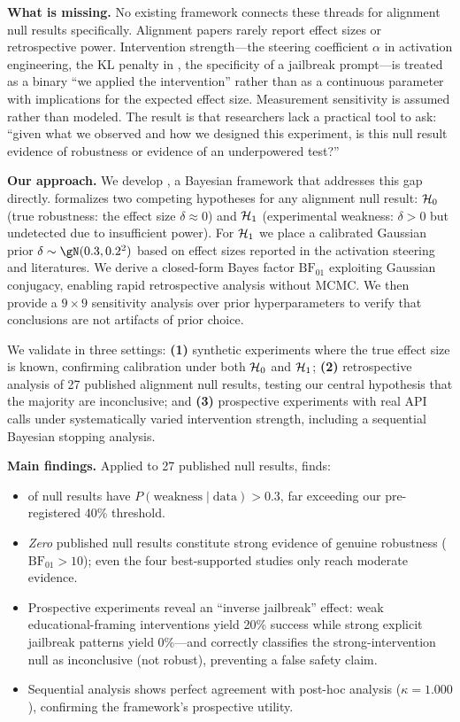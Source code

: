 {\bf What is missing.} No existing framework connects these threads for alignment null
results specifically. Alignment papers rarely report effect sizes or retrospective
power. Intervention strength---the steering coefficient $\alpha$ in activation
engineering, the KL penalty in \rlhf, the specificity of a jailbreak prompt---is
treated as a binary ``we applied the intervention'' rather than as a continuous
parameter with implications for the expected effect size. Measurement sensitivity
is assumed rather than modeled. The result is that researchers lack a practical tool
to ask: ``given what we observed and how we designed this experiment, is this null
result evidence of robustness or evidence of an underpowered test?''

{\bf Our approach.} We develop \ours, a Bayesian framework that addresses this gap
directly. \ours formalizes two competing hypotheses for any alignment null result:
$\mathcal{H}_0$ (true robustness: the effect size $\delta \approx 0$) and $\mathcal{H}_1$ (experimental
weakness: $\delta > 0$ but undetected due to insufficient power). For $\mathcal{H}_1$ we place
a calibrated Gaussian prior $\delta \sim \gN(0.3, 0.2^2)$ based on effect sizes
reported in the activation steering and \rlhf literatures. We derive a closed-form
Bayes factor $\mathrm{BF}_{01}$ exploiting Gaussian conjugacy, enabling rapid
retrospective analysis without MCMC. We then provide a $9 \times 9$ sensitivity
analysis over prior hyperparameters to verify that conclusions are not artifacts of
prior choice.

We validate \ours in three settings: \textbf{(1)} synthetic experiments where the
true effect size is known, confirming calibration under both $\mathcal{H}_0$ and $\mathcal{H}_1$;
\textbf{(2)} retrospective analysis of 27 published alignment null results, testing
our central hypothesis that the majority are inconclusive; and \textbf{(3)}
prospective experiments with real \llama API calls under systematically varied
intervention strength, including a sequential Bayesian stopping analysis.

{\bf Main findings.} Applied to 27 published null results, \ours finds:
\begin{itemize}[leftmargin=*,itemsep=0pt,topsep=4pt]
    \item \mainresult of null results have $P(\text{weakness} \mid \text{data}) > 0.3$,
    far exceeding our pre-registered 40\% threshold.
    \item \emph{Zero} published null results constitute strong evidence of genuine
    robustness ($\mathrm{BF}_{01} > 10$); even the four best-supported studies only
    reach moderate evidence.
    \item Prospective \llama experiments reveal an ``inverse jailbreak'' effect:
    weak educational-framing interventions yield 20\% success while strong explicit
    jailbreak patterns yield 0\%---and \ours correctly classifies the strong-intervention
    null as inconclusive (not robust), preventing a false safety claim.
    \item Sequential analysis shows perfect agreement with post-hoc analysis
    ($\kappa = 1.000$), confirming the framework's prospective utility.
\end{itemize}

